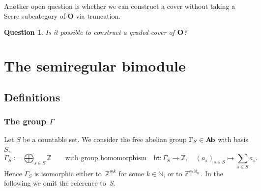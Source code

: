 \documentclass[11pt]{amsart}
\newcommand{\Ab}{\mathbf{A\hspace{-0.5mm}b}}
\newcommand{\htt}{\mathsf{ht}}
\newcommand{\fnul}{{0}}
\newcommand{\bO}{\mathbf{O}}
\newcommand{\mN}{\mathbb{N}}
\newcommand{\mZ}{\mathbb{Z}}
\numberwithin{equation}{section}
\theoremstyle{plain}
\newtheorem{que}[subsubsection]{Question}
\theoremstyle{remark}
\theoremstyle{remark}
\theoremstyle{construction}
\begin{document}
Another open question is whether we can construct a cover without taking a Serre subcategory of $\bO$ via truncation.
\begin{que}
Is it possible to construct a graded cover of ${\bf O}$?
\end{que}





 












\section{The semiregular bimodule}



\subsection{Definitions}

\subsubsection{The group $\Gamma$}\label{defGamma} Let $S$ be a countable set.
We consider the free abelian group $\Gamma_S\in\Ab$ with basis $S$,
$$\Gamma_S:=\bigoplus_{s\in S}\mZ \qquad\mbox{with group homomorphism}\quad \htt:\Gamma_S\to \mZ{,} \quad (a_s)_{s\in S}\mapsto\sum_{s\in S}a_s.$$
Hence $\Gamma_S$ is isomorphic either to~$\mZ^{\oplus k}$ for some $k\in\mN$, or to $\mZ^{\oplus\aleph_0}$. In the following we {omit} the reference to~$S$. 
\end{document}
